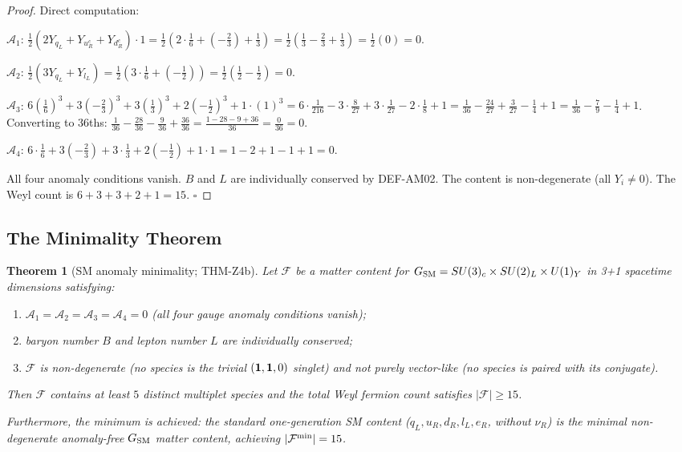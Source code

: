 \documentclass[12pt, a4paper]{article}
\newtheorem{theorem}{Theorem}[section]
\begin{document}
\begin{proof}
Direct computation:

$\mathcal{A}_1$: $\frac{1}{2}(2 Y_{q_L} + Y_{u_R^c} + Y_{d_R^c})
\cdot 1 = \frac{1}{2}(2 \cdot \frac{1}{6} + (-\frac{2}{3}) +
\frac{1}{3}) = \frac{1}{2}(\frac{1}{3} - \frac{2}{3} + \frac{1}{3})
= \frac{1}{2}(0) = 0$. \checkmark

$\mathcal{A}_2$: $\frac{1}{2}(3 Y_{q_L} + Y_{l_L})
= \frac{1}{2}(3 \cdot \frac{1}{6} + (-\frac{1}{2}))
= \frac{1}{2}(\frac{1}{2} - \frac{1}{2}) = 0$. \checkmark

$\mathcal{A}_3$: $6 (\frac{1}{6})^3 + 3(-\frac{2}{3})^3 +
3(\frac{1}{3})^3 + 2(-\frac{1}{2})^3 + 1 \cdot (1)^3
= 6 \cdot \frac{1}{216} - 3 \cdot \frac{8}{27} + 3 \cdot \frac{1}{27}
- 2 \cdot \frac{1}{8} + 1
= \frac{1}{36} - \frac{24}{27} + \frac{3}{27} - \frac{1}{4} + 1
= \frac{1}{36} - \frac{7}{9} - \frac{1}{4} + 1$.
Converting to 36ths: $\frac{1}{36} - \frac{28}{36} - \frac{9}{36}
+ \frac{36}{36} = \frac{1 - 28 - 9 + 36}{36} = \frac{0}{36} = 0$.
\checkmark

$\mathcal{A}_4$: $6 \cdot \frac{1}{6} + 3(-\frac{2}{3}) +
3 \cdot \frac{1}{3} + 2(-\frac{1}{2}) + 1 \cdot 1
= 1 - 2 + 1 - 1 + 1 = 0$. \checkmark

All four anomaly conditions vanish. $B$ and $L$ are individually
conserved by DEF-AM02. The content is non-degenerate (all $Y_i
\neq 0$). The Weyl count is $6 + 3 + 3 + 2 + 1 = 15$. \hfill$\square$
\end{proof}

\subsection{The Minimality Theorem}
\label{sec:theorem}

\begin{theorem}[SM anomaly minimality; THM-Z4b]
\label{thm:minimality}
Let $\mathcal{F}$ be a matter content for
$G_{\rm SM} = SU(3)_c \times SU(2)_L \times U(1)_Y$ in 3+1
spacetime dimensions satisfying:
\begin{enumerate}[leftmargin=*, label=(\roman*), noitemsep]
  \item $\mathcal{A}_1 = \mathcal{A}_2 = \mathcal{A}_3 = \mathcal{A}_4
    = 0$ (all four gauge anomaly conditions vanish);
  \item baryon number $B$ and lepton number $L$ are individually
    conserved;
  \item $\mathcal{F}$ is non-degenerate (no species is the trivial
    $({\bf 1},{\bf 1},0)$ singlet) and not purely vector-like
    (no species is paired with its conjugate).
\end{enumerate}
Then $\mathcal{F}$ contains at least $5$ distinct multiplet species
and the total Weyl fermion count satisfies
$|\mathcal{F}| \geq 15$.

Furthermore, the minimum is achieved: the standard one-generation
SM content ($q_L, u_R, d_R, l_L, e_R$, without $\nu_R$) is the
minimal non-degenerate anomaly-free $G_{\rm SM}$ matter content,
achieving $|\mathcal{F}^{\rm min}| = 15$.
\end{theorem}
\end{document}
